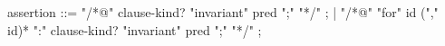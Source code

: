 \begin{syntax}
  assertion ::= "/*@" clause-kind? "invariant" pred ";" "*/" ;
  | "/*@" "for" id ("," id)* ":" clause-kind? "invariant" pred ";" "*/" ;
\end{syntax}
